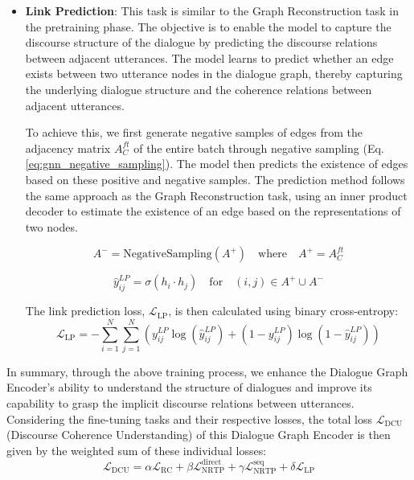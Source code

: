\begin{itemize}
    \item \textbf{Link Prediction}: This task is similar to the Graph Reconstruction task in the pretraining phase. The objective is to enable the model to capture the discourse structure of the dialogue by predicting the discourse relations between adjacent utterances. The model learns to predict whether an edge exists between two utterance nodes in the dialogue graph, thereby capturing the underlying dialogue structure and the coherence relations between adjacent utterances.

    To achieve this, we first generate negative samples of edges from the adjacency matrix $A_{C}^{ft}$ of the entire batch through negative sampling (Eq. \ref{eq:gnn_negative_sampling}). The model then predicts the existence of edges based on these positive and negative samples. The prediction method follows the same approach as the Graph Reconstruction task, using an inner product decoder to estimate the existence of an edge based on the representations of two nodes.

    \begin{equation} \label{eq:gnn_negative_sampling}
        A^{-} = \text{NegativeSampling}(A^{+}) \quad \text{where} \quad A^{+} = A_{C}^{ft}
    \end{equation}

    \begin{equation}
        \hat{y}_{ij}^{LP} = \sigma(h_i \cdot h_j) \quad \text{for} \quad (i, j) \in A^{+} \cup A^{-}
    \end{equation}

     The link prediction loss, \( \mathcal{L}_{\text{LP}} \), is then calculated using binary cross-entropy:
    \begin{equation}
        \mathcal{L}_{\text{LP}} = -\sum_{i=1}^N \sum_{j=1}^N \left( y_{ij}^{LP} \log(\hat{y}_{ij}^{LP}) + (1 - y_{ij}^{LP}) \log(1 - \hat{y}_{ij}^{LP}) \right)
    \end{equation}

\end{itemize}

In summary, through the above training process, we enhance the Dialogue Graph Encoder's ability to understand the structure of dialogues and improve its capability to grasp the implicit discourse relations between utterances. Considering the fine-tuning tasks and their respective losses, the total loss $\mathcal{L}_{\text{DCU}}$ (Discourse Coherence Understanding) of this Dialogue Graph Encoder is then given by the weighted sum of these individual losses:
\begin{equation}
    \mathcal{L}_{\text{DCU}} = \alpha \mathcal{L}_{\text{RC}} + \beta \mathcal{L}_{\text{NRTP}}^{\text{direct}} + \gamma \mathcal{L}_{\text{NRTP}}^{\text{seq}} + \delta \mathcal{L}_{\text{LP}}
\end{equation}


